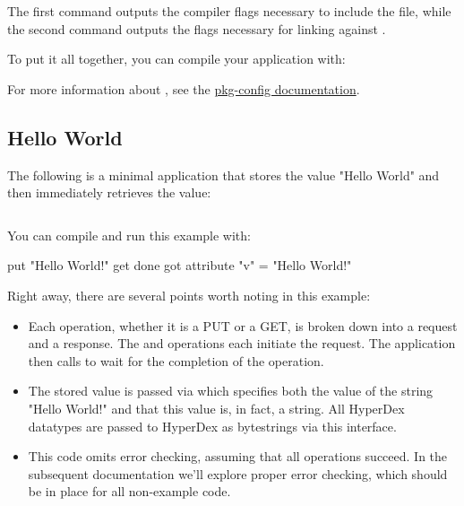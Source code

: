 \begin{consolecode}
\end{consolecode}

The first command outputs the compiler flags necessary to include the
 file, while the second command outputs the flags
necessary for linking against .

To put it all together, you can compile your application with:

\begin{consolecode}
\end{consolecode}

For more information about , see the
\href{http://people.freedesktop.org/~dbn/pkg-config-guide.html#using}{pkg-config
documentation}.

\subsection{Hello World}

The following is a minimal application that stores the value "Hello World" and
then immediately retrieves the value:

\inputminted{c}{api/c/hello-world.c}

You can compile and run this example with:

\begin{consolecode}
put "Hello World!"
get done
got attribute "v" = "Hello World!"
\end{consolecode}

Right away, there are several points worth noting in this example:

\begin{itemize}
\item Each operation, whether it is a PUT or a GET, is broken down into a
request and a response.  The  and
 operations each initiate the request.  The
application then calls  to wait for the completion
of the operation.

\item The stored value is passed via 
which specifies both the value of the string "Hello World!" and that this value
is, in fact, a string.  All HyperDex datatypes are passed to HyperDex as
bytestrings via this interface.

\item This code omits error checking, assuming that all operations succeed.  In
the subsequent documentation we'll explore proper error checking, which should
be in place for all non-example code.
\end{itemize}

